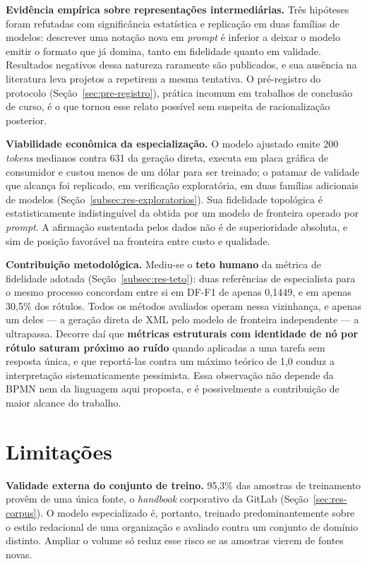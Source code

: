 \textbf{Evidência empírica sobre representações intermediárias.} Três hipóteses foram refutadas com significância estatística e replicação em duas famílias de modelos: descrever uma notação nova em \textit{prompt} é inferior a deixar o modelo emitir o formato que já domina, tanto em fidelidade quanto em validade. Resultados negativos dessa natureza raramente são publicados, e sua ausência na literatura leva projetos a repetirem a mesma tentativa. O pré-registro do protocolo (Seção~\ref{sec:pre-registro}), prática incomum em trabalhos de conclusão de curso, é o que tornou esse relato possível sem suspeita de racionalização posterior.

\textbf{Viabilidade econômica da especialização.} O modelo ajustado emite 200 \textit{tokens} medianos contra 631 da geração direta, executa em placa gráfica de consumidor e custou menos de um dólar para ser treinado; o patamar de validade que alcança foi replicado, em verificação exploratória, em duas famílias adicionais de modelos (Seção~\ref{subsec:res-exploratorios}). Sua fidelidade topológica é estatisticamente indistinguível da obtida por um modelo de fronteira operado por \textit{prompt}. A afirmação sustentada pelos dados não é de superioridade absoluta, e sim de posição favorável na fronteira entre custo e qualidade.

\textbf{Contribuição metodológica.} Mediu-se o \textbf{teto humano} da métrica de fidelidade adotada (Seção~\ref{subsec:res-teto}): duas referências de especialista para o mesmo processo concordam entre si em DF-F1 de apenas 0,1449, e em apenas 30,5\% dos rótulos. Todos os métodos avaliados operam nessa vizinhança, e apenas um deles --- a geração direta de XML pelo modelo de fronteira independente --- a ultrapassa. Decorre daí que \textbf{métricas estruturais com identidade de nó por rótulo saturam próximo ao ruído} quando aplicadas a uma tarefa sem resposta única, e que reportá-las contra um máximo teórico de 1,0 conduz a interpretação sistematicamente pessimista. Essa observação não depende da BPMN nem da linguagem aqui proposta, e é possivelmente a contribuição de maior alcance do trabalho.

\section{Limitações}
\label{sec:limitacoes}

\textbf{Validade externa do conjunto de treino.} 95,3\% das amostras de treinamento provêm de uma única fonte, o \textit{handbook} corporativo da GitLab (Seção~\ref{sec:res-corpus}). O modelo especializado é, portanto, treinado predominantemente sobre o estilo redacional de uma organização e avaliado contra um conjunto de domínio distinto. Ampliar o volume só reduz esse risco se as amostras vierem de fontes novas.


